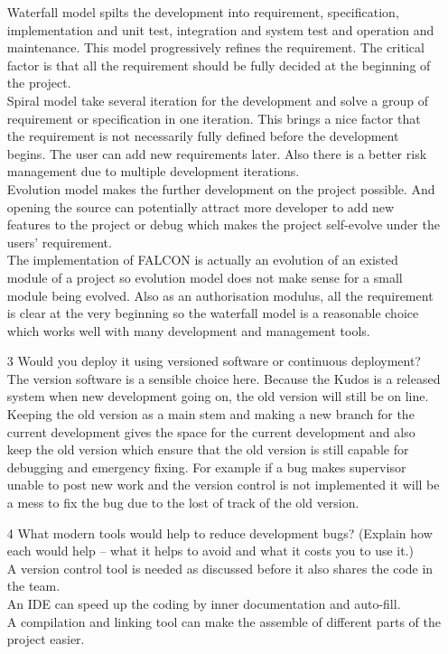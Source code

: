 \documentclass[10pt,twoside,a4paper]{article}
\begin{document}
\begin{itemize}
Waterfall model spilts the development into requirement, specification, implementation and unit test, integration and system test and operation and maintenance. This model progressively refines the requirement.
The critical factor is that all the requirement should be fully decided at the beginning of the project.
\\Spiral model take several iteration for the development and solve a group of requirement or specification in one iteration. This brings a nice factor that the requirement is not necessarily fully defined before the development begins. The user can add new requirements later. Also there is a better risk management due to multiple development iterations.
\\Evolution model makes the further development on the project possible. And opening the source can potentially attract more developer to add new features to the project or debug which makes the project self-evolve under the users' requirement.
\\The implementation of FALCON is actually an evolution of an existed module of a project so evolution model does not make sense for a small module being evolved. Also as an authorisation modulus, all the requirement is clear at the very beginning so the waterfall model is a reasonable choice which works well with many development and management tools.
\item[3] Would you deploy it using versioned software or continuous deployment? 
The version software is a sensible choice here. Because the Kudos is a released system when new development going on, the old version will still be on line. Keeping the old version as a main stem and making a new branch for the current development gives the space for the current development and also keep the old version which ensure that the old version is still capable for debugging and emergency fixing. For example if a bug makes supervisor unable to post new work and the version control is not implemented it will be a mess to fix the bug due to the lost of track of the old version. 
\item[4] What modern tools would help to reduce development bugs? (Explain how each would help -- what it helps to avoid and what it costs you to use it.) 
\\A version control tool is needed as discussed before it also shares the code in the team.
\\An IDE can speed up the coding by inner documentation and auto-fill.
\\A compilation and linking tool can make the assemble of different parts of the project easier.

\end{itemize}
\end{document}
